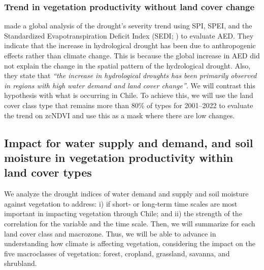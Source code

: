 \documentclass[
  authoryear,
  preprint,
  3p,
  onecolumn]{elsarticle}
\begin{document}
\hypertarget{trend-in-vegetation-productivity-without-land-cover-change}{%
\subsubsection{Trend in vegetation productivity without land cover
change}\label{trend-in-vegetation-productivity-without-land-cover-change}}

\citet{Vicente-Serrano2021} made a global analysis of the drought's
severity trend using SPI, SPEI, and the Standardized Evapotranspiration
Deficit Index (SEDI; \citet{Vicente-Serrano2018}) to evaluate AED. They
indicate that the increase in hydrological drought has been due to
anthropogenic effects rather than climate change. This is because the
global increase in AED did not explain the change in the spatial pattern
of the hydrological drought. Also, they state that \emph{``the increase
in hydrological droughts has been primarily observed in regions with
high water demand and land cover change''}. We will contrast this
hypothesis with what is occurring in Chile. To achieve this, we will use
the land cover class type that remains more than 80\% of types for
2001--2022 to evaluate the trend on zcNDVI and use this as a mask where
there are low changes.

\hypertarget{impact-for-water-supply-and-demand-and-soil-moisture-in-vegetation-productivity-within-land-cover-types}{%
\subsection{Impact for water supply and demand, and soil moisture in
vegetation productivity within land cover
types}\label{impact-for-water-supply-and-demand-and-soil-moisture-in-vegetation-productivity-within-land-cover-types}}

We analyze the drought indices of water demand and supply and soil
moisture against vegetation to address: i) if short- or long-term time
scales are most important in impacting vegetation through Chile; and ii)
the strength of the correlation for the variable and the time scale.
Then, we will summarize for each land cover class and macrozone. Thus,
we will be able to advance in understanding how climate is affecting
vegetation, considering the impact on the five macroclasses of
vegetation: forest, cropland, grassland, savanna, and shrubland.
\end{document}

